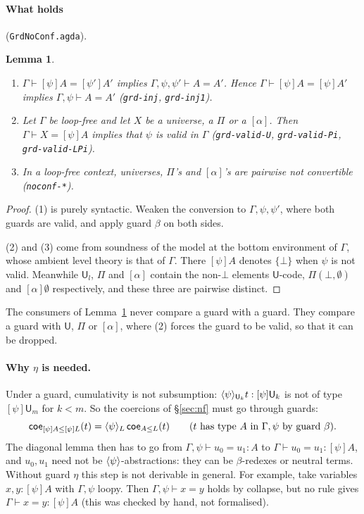 \documentclass[10pt]{article}
\newcommand{\U}{\mathsf{U}}
\newcommand{\coe}{\mathsf{coe}}
\newcommand{\grd}[2]{[#1]#2}
\newcommand{\glam}[2]{\langle #1\rangle #2}
\newcommand{\lpi}[1]{[\alpha]#1}
\newcommand{\agda}[1]{\texttt{#1}}
\newtheorem{lemma}[theorem]{Lemma}
\theoremstyle{remark}
\begin{document}
\paragraph{What holds} (\agda{GrdNoConf.agda}).
\begin{lemma}\label{lem:grd}
\begin{enumerate}
\item $\Gamma\vdash\grd\psi A=\grd{\psi'}A'$ implies
  $\Gamma,\psi,\psi'\vdash A=A'$.  Hence $\Gamma\vdash\grd\psi A=\grd\psi A'$
  implies $\Gamma,\psi\vdash A=A'$ (\agda{grd-inj}, \agda{grd-inj1}).
\item Let $\Gamma$ be loop-free and let $X$ be a universe, a $\Pi$ or a
  $\lpi{}$.  Then $\Gamma\vdash X=\grd\psi A$ implies that $\psi$ is valid in
  $\Gamma$ (\agda{grd-valid-U}, \agda{grd-valid-Pi}, \agda{grd-valid-LPi}).
\item In a loop-free context, universes, $\Pi$'s and $\lpi{}$'s are pairwise
  not convertible (\agda{noconf-*}).
\end{enumerate}
\end{lemma}
\begin{proof}
(1) is purely syntactic.  Weaken the conversion to $\Gamma,\psi,\psi'$, where
both guards are valid, and apply guard $\beta$ on both sides.

(2) and (3) come from soundness of the model at the bottom environment
of $\Gamma$, whose ambient level theory is that of $\Gamma$.  There
$\grd\psi A$ denotes $\{\bot\}$ when $\psi$ is not valid.  Meanwhile $\U_l$,
$\Pi$ and $\lpi{}$ contain the non-$\bot$ elements $\U$-code, $\Pi(\bot,\emptyset)$
and $[\alpha]\emptyset$ respectively, and these three are pairwise distinct.
\end{proof}
\noindent
The consumers of Lemma~\ref{lem:grd} never compare a guard with a guard.
They compare a guard with $\U$, $\Pi$ or $[\alpha]$, where (2) forces the
guard to be valid, so that it can be dropped.

\paragraph{Why $\eta$ is needed.}  Under a guard, cumulativity is not
subsumption: $\glam\psi_{\U_{k}}t:\grd\psi\U_k$ is not of type
$\grd\psi\U_m$ for $k<m$.  So the coercions of \S\ref{sec:nf} must go through
guards:
\[
\coe_{\grd\psi A\le\grd\psi L}(t)=\glam\psi_L\,\coe_{A\le L}(t)
\qquad (t\text{ has type }A\text{ in }\Gamma,\psi\text{ by guard }\beta).
\]
The diagonal lemma then has to go from $\Gamma,\psi\vdash u_0=u_1:A$ to
$\Gamma\vdash u_0=u_1:\grd\psi A$, and $u_0,u_1$ need not be
$\glam\psi$-abstractions: they can be $\beta$-redexes or neutral terms.
Without guard $\eta$ this step is not derivable in general.  For example, take
variables $x,y:\grd\psi A$ with $\Gamma,\psi$ loopy.  Then
$\Gamma,\psi\vdash x=y$ holds by collapse, but no rule gives $\Gamma\vdash
x=y:\grd\psi A$ (this was checked by hand, not formalised).
\end{document}
